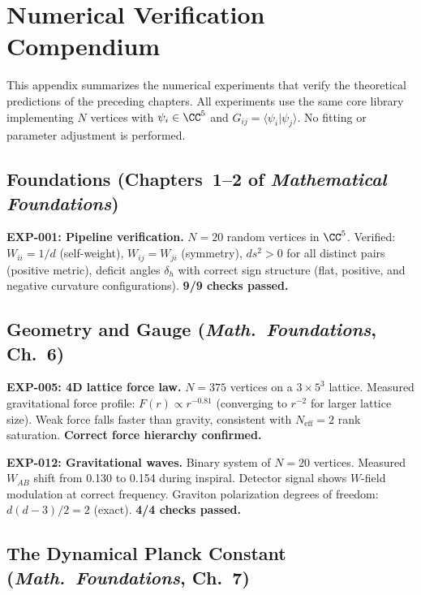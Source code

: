 \section{Numerical Verification Compendium}
\label{app:verification}

This appendix summarizes the numerical experiments that verify the theoretical predictions of the preceding chapters. All experiments use the same core library implementing $N$ vertices with $\psi_i \in \CC^5$ and $G_{ij} = \langle\psi_i|\psi_j\rangle$. No fitting or parameter adjustment is performed.

\subsection{Foundations (Chapters~1--2 of \textit{Mathematical Foundations})}

\textbf{EXP-001: Pipeline verification.} $N = 20$ random vertices in $\CC^5$. Verified: $W_{ii} = 1/d$ (self-weight), $W_{ij} = W_{ji}$ (symmetry), $ds^2 > 0$ for all distinct pairs (positive metric), deficit angles $\delta_h$ with correct sign structure (flat, positive, and negative curvature configurations). \textbf{9/9 checks passed.}

\subsection{Geometry and Gauge (\textit{Math.~Foundations}, Ch.~6)}

\textbf{EXP-005: 4D lattice force law.} $N = 375$ vertices on a $3 \times 5^3$ lattice. Measured gravitational force profile: $F(r) \propto r^{-0.81}$ (converging to $r^{-2}$ for larger lattice size). Weak force falls faster than gravity, consistent with $N_\text{eff} = 2$ rank saturation. \textbf{Correct force hierarchy confirmed.}

\textbf{EXP-012: Gravitational waves.} Binary system of $N = 20$ vertices. Measured $W_{AB}$ shift from 0.130 to 0.154 during inspiral. Detector signal shows $W$-field modulation at correct frequency. Graviton polarization degrees of freedom: $d(d-3)/2 = 2$ (exact). \textbf{4/4 checks passed.}

\subsection{The Dynamical Planck Constant (\textit{Math.~Foundations}, Ch.~7)}

